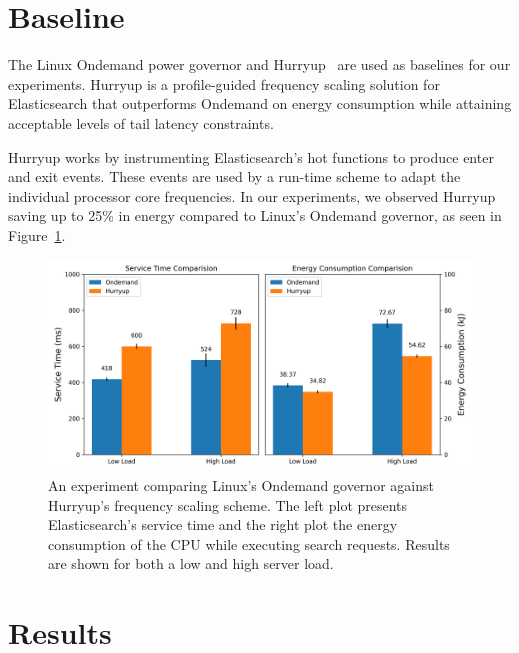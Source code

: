 
\section{Baseline}

The Linux Ondemand power governor and Hurryup~\cite{hurryupccgrid} are used as baselines for our experiments. Hurryup is a profile-guided frequency scaling solution for Elasticsearch that outperforms Ondemand on energy consumption while attaining acceptable levels of tail latency constraints.

Hurryup works by instrumenting Elasticsearch's hot functions to produce enter and exit events. These events are used by a run-time scheme to adapt the individual processor core frequencies. In our experiments, we observed Hurryup saving up to 25\% in energy compared to Linux's Ondemand governor, as seen in Figure~\ref{fig:ondem_vs_hup}.

\begin{figure}[hb]
\centering
\includegraphics[width=1.0\textwidth]{src/figure/ondem_vs_hup.png}
\caption{An experiment comparing Linux's Ondemand governor against Hurryup's frequency scaling scheme. The left plot presents Elasticsearch's service time and the right plot the energy consumption of the CPU while executing search requests. Results are shown for both a low and high server load.}
\label{fig:ondem_vs_hup}
\end{figure}

\section{Results}


